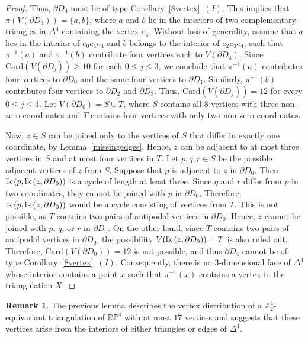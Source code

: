 \documentclass[11pt]{amsart}
\numberwithin{equation}{section}
\theoremstyle{definition}
\newtheorem{remark}[theorem]{Remark}
\newcommand{\lk}{\mbox{\upshape lk}\,}
\newcommand{\RP}{\mathbb{RP}}
\newcommand{\D}{\Delta}
\def \bb{\mathbb}
\def \ZZ{{\bb{Z}}}
\begin{document}
\begin{proof}
Thus, $\partial D_4$ must be of type Corollary~\ref{8vertex}~$(I)$. This implies that $\pi(V(\partial D_4)) = \{a, b\}$, where $a$ and $b$ lie in the interiors of two complementary triangles in $\D^4$ containing the vertex $e_4$. Without loss of generality, assume that $a$ lies in the interior of $e_0e_1e_4$ and $b$ belongs to the interior of $e_2e_3e_4$, such that $\pi^{-1}(a)$ and $\pi^{-1}(b)$ contribute four vertices each to $V(\partial D_4)$.
Since $\mathrm{Card}(V(\partial D_j)) \geq 10$ for each $0 \leq j \leq 3$, we conclude that $\pi^{-1}(a)$ contributes four vertices to $\partial D_0$ and the same four vertices to $\partial D_1$. Similarly, $\pi^{-1}(b)$ contributes four vertices to $\partial D_2$ and $\partial D_3$. Thus, $\mathrm{Card}(V(\partial D_j)) = 12$ for every $0 \leq j \leq 3$. Let $V(\partial D_0) = S \cup T$, where $S$ contains all $8$ vertices with three non-zero coordinates and $T$ contains four vertices with only two non-zero coordinates.

Now, $z \in S$ can be joined only to the vertices of $S$ that differ in exactly one coordinate, by Lemma~\ref{missingedges}. Hence, $z$ can be adjacent to at most three vertices in $S$ and at most four vertices in $T$. Let $p, q, r \in S$ be the possible adjacent vertices of $z$ from $S$. Suppose that $p$ is adjacent to $z$ in $\partial D_0$. Then $\lk(p, \lk(z, \partial D_0))$ is a cycle of length at least three. Since $q$ and $r$ differ from $p$ in two coordinates, they cannot be joined with $p$ in $\partial D_0$. Therefore, $\lk(p, \lk(z, \partial D_0))$ would be a cycle consisting of vertices from $T$. This is not possible, as $T$ contains two pairs of antipodal vertices in $\partial D_0$. Hence, $z$ cannot be joined with $p$, $q$, or $r$ in $\partial D_0$. On the other hand, since $T$ contains two pairs of antipodal vertices in $\partial D_0$, the possibility $V(\lk(z, \partial D_0)) = T$ is also ruled out.
Therefore, $\mathrm{Card}(V(\partial D_0)) = 12$ is not possible, and thus $\partial D_4$ cannot be of type Corollary~\ref{8vertex}~$(I)$. Consequently, there is no $3$-dimensional face of $\D^4$ whose interior contains a point $x$ such that $\pi^{-1}(x)$ contains a vertex in the triangulation $X$.
\end{proof}

\begin{remark}
 The previous lemma describes the vertex distribution of a $\ZZ_2^4$-equivariant triangulation of $\RP^4$ with at most $17$ vertices and suggests that these vertices arise from the interiors of either triangles or edges of $\D^4$.
\end{remark}
\end{document}
